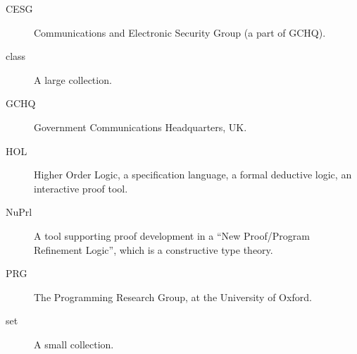 \documentclass[10pt,titlepage]{book}
\begin{document}
\begin{description}
\item[CESG]{} Communications and Electronic Security Group (a part of GCHQ).
\item[class]{} A large collection.
\item[GCHQ]{} Government Communications Headquarters, UK.
\item[HOL]{} Higher Order Logic, a specification language, a formal deductive logic, an interactive proof tool.
\item[NuPrl]{} A tool supporting proof development in a ``New Proof/Program Refinement Logic'', which is a constructive type theory.
\item[PRG]{} The Programming Research Group, at the University of Oxford.
\item[set]{} A small collection.
\end{description}

\backmatter




\label{index}
\twocolumn[]
{\small\printindex}
\end{document}
